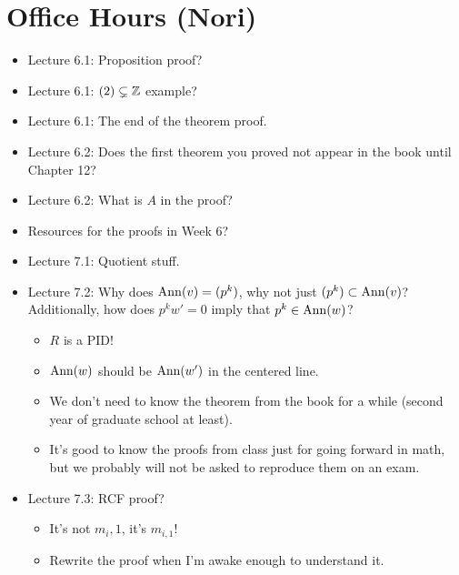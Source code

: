 \documentclass[../notes.tex]{subfiles}
\begin{document}
\section{Office Hours (Nori)}
\begin{itemize}
    \item {}Lecture 6.1: Proposition proof?
    \item Lecture 6.1: $(2)\subsetneq\mathbb{Z}$ example?
    \item Lecture 6.1: The end of the theorem proof.
    \item Lecture 6.2: Does the first theorem you proved not appear in the book until Chapter 12?
    \item Lecture 6.2: What is $A$ in the proof?
    \item Resources for the proofs in Week 6?
    \item Lecture 7.1: Quotient stuff.
    \item Lecture 7.2: Why does $\operatorname{Ann}(v)=(p^k)$, why not just $(p^k)\subset\operatorname{Ann}(v)$? Additionally, how does $p^kw'=0$ imply that $p^k\in\operatorname{Ann}(w)$?
    \begin{itemize}
        \item $R$ is a PID!
        \item $\operatorname{Ann}(w)$ should be $\operatorname{Ann}(w')$ in the centered line.
        \item We don't need to know the theorem from the book for a while (second year of graduate school at least).
        \item It's good to know the proofs from class just for going forward in math, but we probably will not be asked to reproduce them on an exam.
    \end{itemize}
    \item Lecture 7.3: RCF proof?
    \begin{itemize}
        \item It's not $m_i,1$, it's $m_{i,1}$!
        \item Rewrite the proof when I'm awake enough to understand it.
    \end{itemize}
\end{itemize}
\end{document}
